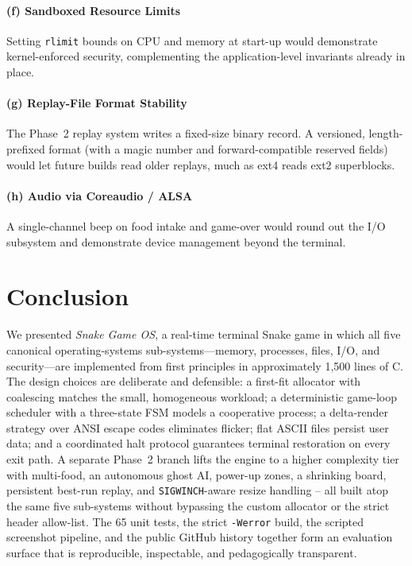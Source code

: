 \documentclass[conference]{IEEEtran}
\begin{document}
\paragraph{(f) Sandboxed Resource Limits}
Setting \texttt{rlimit} bounds on CPU and memory at start-up would demonstrate kernel-enforced security, complementing the application-level invariants already in place.

\paragraph{(g) Replay-File Format Stability}
The Phase~2 replay system writes a fixed-size binary record. A versioned, length-prefixed format (with a magic number and forward-compatible reserved fields) would let future builds read older replays, much as ext4 reads ext2 superblocks.

\paragraph{(h) Audio via Coreaudio / ALSA}
A single-channel beep on food intake and game-over would round out the I/O subsystem and demonstrate device management beyond the terminal.

\section{Conclusion}
\label{sec:conclusion}

We presented \textit{Snake Game OS}, a real-time terminal Snake game in which all five canonical operating-systems sub-systems---memory, processes, files, I/O, and security---are implemented from first principles in approximately 1{,}500 lines of C. The design choices are deliberate and defensible: a first-fit allocator with coalescing matches the small, homogeneous workload; a deterministic game-loop scheduler with a three-state FSM models a cooperative process; a delta-render strategy over ANSI escape codes eliminates flicker; flat ASCII files persist user data; and a coordinated halt protocol guarantees terminal restoration on every exit path. A separate Phase~2 branch lifts the engine to a higher complexity tier with multi-food, an autonomous ghost AI, power-up zones, a shrinking board, persistent best-run replay, and \texttt{SIGWINCH}-aware resize handling -- all built atop the same five sub-systems without bypassing the custom allocator or the strict header allow-list. The 65 unit tests, the strict \texttt{-Werror} build, the scripted screenshot pipeline, and the public GitHub history together form an evaluation surface that is reproducible, inspectable, and pedagogically transparent.
\end{document}
